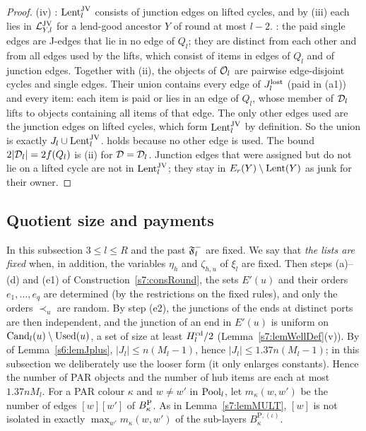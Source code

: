 \begin{proof}
(iv) : $\mathrm{Lent}^{\mathrm{JV}}_l$ consists of junction edges on lifted cycles, and by
(iii) each lies in $\mathcal{L}^{\mathrm{JV}}_{Y,l}$ for a lend-good ancestor $Y$ of round at most
$l-2$. : the paid single edges are J-edges that lie in no edge of $Q_l$;
they are distinct from each other and from all edges used by the lifts, which
consist of items in edges of $Q_l$ and of junction edges. Together with (ii), the
objects of $\mathcal{O}_l$ are pairwise edge-disjoint cycles and single edges. Their
union contains every edge of $J^{\mathrm{lost}}_l$ (paid in (a1)) and every item: each item
is paid or lies in an edge of $Q_l$, whose member of $\mathcal{D}_l$ lifts to objects
containing all items of that edge. The only other edges used are the junction
edges on lifted cycles, which form $\mathrm{Lent}^{\mathrm{JV}}_l$ by definition. So the union is
exactly $J_l\cup\mathrm{Lent}^{\mathrm{JV}}_l$.  holds because no other edge is used. The
bound $2|\mathcal{D}_l|=2f(Q_l)$ is (ii) for $\mathcal{D}=\mathcal{D}_l$. Junction edges that were
assigned but do not lie on a lifted cycle are not in $\mathrm{Lent}^{\mathrm{JV}}_l$; they stay in
$E_r(Y)\setminus\mathrm{Lent}(Y)$ as junk for their owner.
\end{proof}

\subsection{Quotient size and payments}

In this subsection $3\le l\le R$ and the past $\mathfrak{F}^{-}_l$ are fixed. We say that
\emph{the lists are fixed} when, in addition, the variables $\eta_h$ and
$\zeta_{h,u}$ of $\xi_l$ are fixed. Then steps (a)--(d) and (e1) of
Construction~\ref{s7:consRound}, the sets $E'(u)$ and their orders
$e_1,\dots,e_q$ are determined (by the restrictions on the fixed rules), and
only the orders $\prec_u$ are random. By step (e2), the junctions of the ends at distinct ports are then
independent, and the junction of an end in $E'(u)$ is uniform on
$\mathrm{Cand}_l(u)\setminus\mathrm{Used}(u)$, a set of size at least $H^{\mathrm{cd}}_l/2$
(Lemma~\ref{s7:lemWellDef}(v)). By  of Lemma~\ref{s6:lemJplus},
$|J_l|\le n(M_l-1)$, hence $|J_l|\le1.37n(M_l-1)$; in this subsection we
deliberately use the looser form (it only enlarges constants). Hence the number of PAR
objects and the number of hub items are each at most $1.37nM_l$. For a PAR colour $\kappa$ and $w\ne w'$ in
$\mathrm{Pool}_l$, let $m_\kappa(w,w')$ be the number of edges $[w][w']$ of $B^{\mathrm{P}}_\kappa$.
As in Lemma~\ref{s7:lemMULT}, $[w]$ is not isolated in exactly
$\max_{w'}m_\kappa(w,w')$ of the sub-layers $B^{\mathrm{P},(\iota)}_\kappa$.

